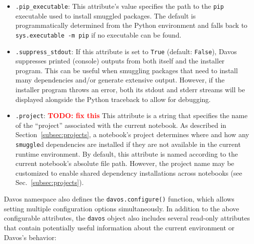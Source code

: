 \documentclass[preprint,12pt,a4paper]{elsarticle}
\begin{document}
\begin{itemize}
\item \texttt{.pip\_executable}: This attribute's value specifies the
  path to the \texttt{pip} executable used to install smuggled
  packages. The default is programmatically determined from the Python
  environment and falls back to \texttt{sys.executable -m pip} if no
  executable can be found.

\item \texttt{.suppress\_stdout}: If this attribute is set to
  \texttt{True} (default: \texttt{False}), Davos suppresses
  printed (console) outputs from both itself and the installer program.
  This can be useful when smuggling packages that need to install many
  dependencies and/or generate extensive output. However, if the installer
  program throws an error, both its stdout and stderr streams will be
  displayed alongside the Python traceback to allow for debugging.

\item \texttt{.project}: \textcolor{red}{\textbf{TODO: fix this}} This attribute is a string that specifies the name of
the ``project'' associated with the current notebook. As described in
Section~\ref{subsec:projects}, a notebook's project determines where and how
any \texttt{smuggle}d dependencies are installed if they are not available in
the current runtime environment. By default, this attribute is named according
to the current notebook's absolute file path. However, the project name may be
customized to enable shared dependency installations across notebooks (see
Sec.~\ref{subsec:projects}).

\end{itemize}

\noindent Davos namespace also defines the \texttt{davos.configure()} function,
which allows setting multiple configuration options simultaneously. In addition
to the above configurable attributes, the \texttt{davos} object also includes
several read-only attributes that contain potentially useful information about
the current environment or Davos's behavior:
\end{document}

